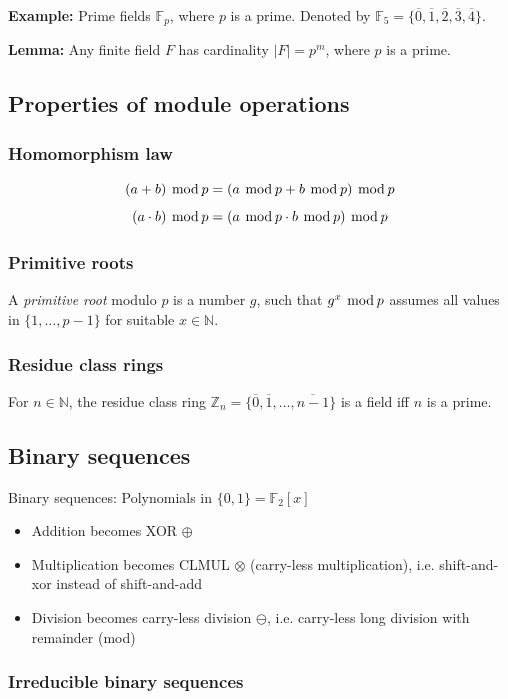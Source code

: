 \documentclass[a4paper]{scrartcl}
\newcommand\N{\mathbb N}
\newcommand\Z{\mathbb Z}
\newcommand\F{\mathbb F}
\renewcommand\mod{\hspace*{0.4em}\mathrm{mod}\hspace*{0.2em}}
\begin{document}
\textbf{Example:} Prime fields $\F_p$, where $p$ is a prime. Denoted by
$\F_5=\{\overline 0,\overline1,\overline2,\overline3,\overline4\}$.

\textbf{Lemma:} Any finite field $F$ has cardinality $|F|=p^m$, where
$p$ is a prime.

\subsection{Properties of module operations}
\subsubsection{Homomorphism law}

\[(a+b)\mod p = (a \mod p + b \mod p) \mod p\]
\[(a\cdot b)\mod p = (a \mod p \cdot b \mod p) \mod p\]

\subsubsection{Primitive roots}
A \textit{primitive root} modulo $p$ is a number $g$, such that $g^x\mod p$ assumes
all values in $\{1,\hdots,p-1\}$ for suitable $x\in\N$.

\subsubsection{Residue class rings}

For $n\in\N$, the residue class ring $\Z_n = \{\overline0,\overline1,\hdots,\overline{n-1}\}$
is a field iff $n$ is a prime.

\subsection{Binary sequences}

Binary sequences: Polynomials in $\{0,1\}=\F_2[x]$
\begin{itemize}
    \item Addition becomes XOR $\oplus$
    \item Multiplication becomes CLMUL $\otimes$ (carry-less multiplication), i.e. shift-and-xor
        instead of shift-and-add
    \item Division becomes carry-less division $\ominus$, i.e. carry-less long division with
        remainder (mod)
\end{itemize}

\subsubsection{Irreducible binary sequences}
\end{document}
